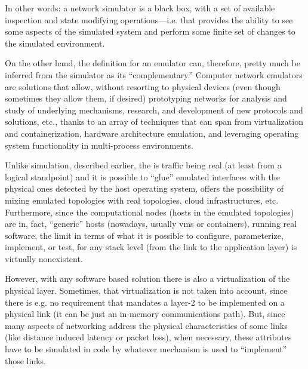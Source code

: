 In other words: a network simulator is a black box, with a set of available inspection and state modifying operations---i.e. that provides the ability to see some aspects of the simulated system and perform some finite set of changes to the simulated environment.

On the other hand, the definition for an emulator can, therefore, pretty much be inferred from the simulator as its ``complementary.''
Computer network emulators are solutions that allow, without resorting to physical devices (even though sometimes they allow them, if desired) prototyping networks for analysis and study of underlying mechanisms, research, and development of new protocols and solutions, etc., thanks to an array of techniques that can span from virtualization and containerization, hardware architecture emulation, and leveraging operating system functionality in multi-process environments.

Unlike simulation, described earlier, the is traffic being real (at least from a logical standpoint) and it is possible to ``glue'' emulated interfaces with the physical ones detected by the host operating system, offers the possibility of mixing emulated topologies with real topologies, cloud infrastructures, etc.
Furthermore, since the computational nodes (hosts in the emulated topologies) are in, fact, ``generic'' hosts (nowadays, usually \glspl{vm} or containers), running real software, the limit in terms of what it is possible to configure, parameterize, implement, or test, for any stack level (from the link to the application layer) is virtually nonexistent.

However, with any software based solution there is also a virtualization of the physical layer.
Sometimes, that virtualization is not taken into account, since there is e.g. no requirement that mandates a layer-2 to be implemented on a physical link (it can be just an in-memory communications path).
But, since many aspects of networking address the physical characteristics of some links (like distance induced latency or packet loss), when necessary, these attributes have to be simulated in code by whatever mechanism is used to ``implement'' those links.

